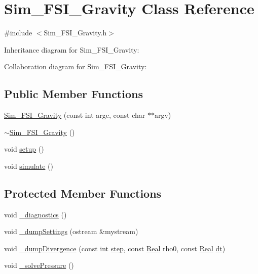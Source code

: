 \hypertarget{class_sim___f_s_i___gravity}{}\section{Sim\+\_\+\+F\+S\+I\+\_\+\+Gravity Class Reference}
\label{class_sim___f_s_i___gravity}


{\ttfamily \#include $<$Sim\+\_\+\+F\+S\+I\+\_\+\+Gravity.\+h$>$}



Inheritance diagram for Sim\+\_\+\+F\+S\+I\+\_\+\+Gravity\+:


Collaboration diagram for Sim\+\_\+\+F\+S\+I\+\_\+\+Gravity\+:
\subsection*{Public Member Functions}
\begin{DoxyCompactItemize}
\item 
\hyperlink{class_sim___f_s_i___gravity_a66f07ee31fb03d03da96cb53ec48af9d}{Sim\+\_\+\+F\+S\+I\+\_\+\+Gravity} (const int argc, const char $\ast$$\ast$argv)
\item 
\hyperlink{class_sim___f_s_i___gravity_ae64d227ac1845eecae168f8293f78432}{$\sim$\+Sim\+\_\+\+F\+S\+I\+\_\+\+Gravity} ()
\item 
void \hyperlink{class_sim___f_s_i___gravity_a953c04bca39f4c6ace76c307aa00b097}{setup} ()
\item 
void \hyperlink{class_sim___f_s_i___gravity_add86d6f52de51511f0bb93714fc504c4}{simulate} ()
\end{DoxyCompactItemize}
\subsection*{Protected Member Functions}
\begin{DoxyCompactItemize}
\item 
void \hyperlink{class_sim___f_s_i___gravity_a0eb1be561cbc294534d7598b736515f0}{\+\_\+diagnostics} ()
\item 
void \hyperlink{class_sim___f_s_i___gravity_a1c0403f8126998a080e154a0d4cdbe92}{\+\_\+dump\+Settings} (ostream \&mystream)
\item 
void \hyperlink{class_sim___f_s_i___gravity_a6825457adf9b31ba9da6bc6056263852}{\+\_\+dump\+Divergence} (const int \hyperlink{class_sim___f_s_i___fixed_ab006780562c89322d5899acf98ba30fb}{step}, const \hyperlink{_h_d_f5_dumper_8h_a445a5f0e2a34c9d97d69a3c2d1957907}{Real} rho0, const \hyperlink{_h_d_f5_dumper_8h_a445a5f0e2a34c9d97d69a3c2d1957907}{Real} \hyperlink{class_sim___f_s_i___fixed_aac96337fe38ebde7c000b48e9cc8a5a9}{dt})
\item 
void \hyperlink{class_sim___f_s_i___gravity_a3bda0222882a28818ad1ecdfcf3e4ec2}{\+\_\+solve\+Pressure} ()
\end{DoxyCompactItemize}
